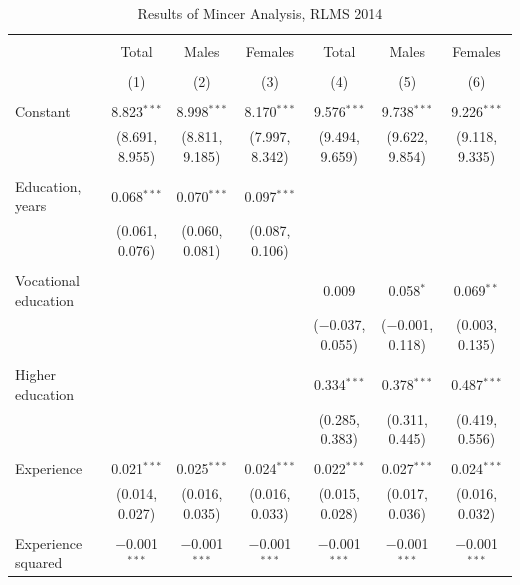 \documentclass[alpha-refs]{wiley-article-01g}
\begin{document}
\begin{landscape}
	
	\fontsize{9}{11}
	\selectfont
	
	\begin{table}[!htbp] \centering 
\renewcommand{\arraystretch}{1.0}
		\caption{Results of Mincer Analysis, RLMS 2014} 
		\label{} 
		\begin{tabular}{@{\extracolsep{5pt}}lcccccc} 
			\\[-.8ex]\hline 
			\hline \\[-.8ex] 
			& Total & Males & Females & Total & Males & Females \\ 
			\\[-.8ex] & (1) & (2) & (3) & (4) & (5) & (6)\\ 
			\hline \\[-.8ex] 
			Constant & 8.823$^{***}$ & 8.998$^{***}$ & 8.170$^{***}$ & 9.576$^{***}$ & 9.738$^{***}$ & 9.226$^{***}$ \\ 
			& (8.691, 8.955) & (8.811, 9.185) & (7.997, 8.342) & (9.494, 9.659) & (9.622, 9.854) & (9.118, 9.335) \\ 
			& & & & & & \\ 
			Education, years & 0.068$^{***}$ & 0.070$^{***}$ & 0.097$^{***}$ &  &  &  \\ 
			& (0.061, 0.076) & (0.060, 0.081) & (0.087, 0.106) &  &  &  \\ 
			& & & & & & \\ 
			Vocational education &  &  &  & 0.009 & 0.058$^{*}$ & 0.069$^{**}$ \\ 
			&  &  &  & ($-$0.037, 0.055) & ($-$0.001, 0.118) & (0.003, 0.135) \\ 
			& & & & & & \\ 
			Higher education &  &  &  & 0.334$^{***}$ & 0.378$^{***}$ & 0.487$^{***}$ \\ 
			&  &  &  & (0.285, 0.383) & (0.311, 0.445) & (0.419, 0.556) \\ 
			& & & & & & \\ 
			Experience & 0.021$^{***}$ & 0.025$^{***}$ & 0.024$^{***}$ & 0.022$^{***}$ & 0.027$^{***}$ & 0.024$^{***}$ \\ 
			& (0.014, 0.027) & (0.016, 0.035) & (0.016, 0.033) & (0.015, 0.028) & (0.017, 0.036) & (0.016, 0.032) \\ 
			& & & & & & \\ 
			Experience squared & $-$0.001$^{***}$ & $-$0.001$^{***}$ & $-$0.001$^{***}$ & $-$0.001$^{***}$ & $-$0.001$^{***}$ & $-$0.001$^{***}$ \\ 

\end{tabular}
\end{table}
\end{landscape}
\end{document}
